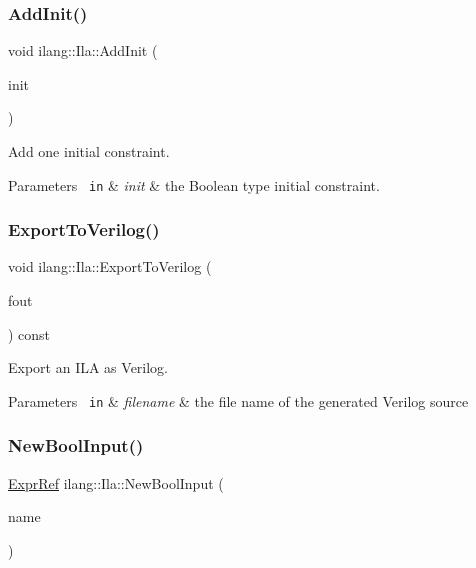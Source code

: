 \subsubsection{\texorpdfstring{Add\+Init()}{AddInit()}}
{\footnotesize\ttfamily void ilang\+::\+Ila\+::\+Add\+Init (\begin{DoxyParamCaption}\item[{const \mbox{\hyperlink{classilang_1_1_expr_ref}{Expr\+Ref}} \&}]{init }\end{DoxyParamCaption})}



Add one initial constraint. 


\begin{DoxyParams}[1]{Parameters}
\mbox{\texttt{ in}}  & {\em init} & the Boolean type initial constraint. \\
\hline
\end{DoxyParams}
\mbox{\label{classilang_1_1_ila_a08499172526aea2df0a58420de5eab44}} 
\subsubsection{\texorpdfstring{Export\+To\+Verilog()}{ExportToVerilog()}}
{\footnotesize\ttfamily void ilang\+::\+Ila\+::\+Export\+To\+Verilog (\begin{DoxyParamCaption}\item[{std\+::ostream \&}]{fout }\end{DoxyParamCaption}) const}



Export an I\+LA as Verilog. 


\begin{DoxyParams}[1]{Parameters}
\mbox{\texttt{ in}}  & {\em filename} & the file name of the generated Verilog source \\
\hline
\end{DoxyParams}
\mbox{\label{classilang_1_1_ila_a08e6a42c29779103ef08e87142048aec}} 
\subsubsection{\texorpdfstring{New\+Bool\+Input()}{NewBoolInput()}}
{\footnotesize\ttfamily \mbox{\hyperlink{classilang_1_1_expr_ref}{Expr\+Ref}} ilang\+::\+Ila\+::\+New\+Bool\+Input (\begin{DoxyParamCaption}\item[{const std\+::string \&}]{name }\end{DoxyParamCaption})}



